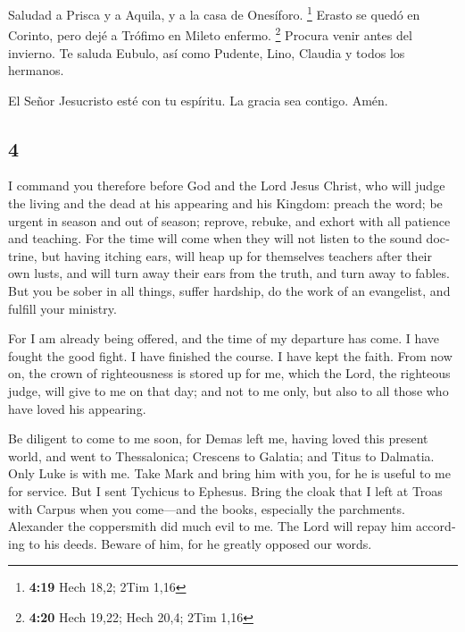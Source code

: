 \begin{paracol}{2}
 Saludad a Prisca y a Aquila, y a la casa de Onesíforo.
\footnote{\textbf{4:19} Hech 18,2; 2Tim 1,16}  Erasto se
quedó en Corinto, pero dejé a Trófimo en Mileto enfermo. \footnote{\textbf{4:20}
  Hech 19,22; Hech 20,4; 2Tim 1,16}  Procura venir antes
del invierno. Te saluda Eubulo, así como Pudente, Lino, Claudia y todos
los hermanos.

 El Señor Jesucristo esté con tu espíritu. La gracia sea
contigo. Amén. \switchcolumn \begin{otherlanguage}{english}

\hypertarget{section-7}{%
\section{4}\label{section-7}}

 I command you therefore before God and the Lord Jesus
Christ, who will judge the living and the dead at his appearing and his
Kingdom:  preach the word; be urgent in season and out of
season; reprove, rebuke, and exhort with all patience and teaching.
 For the time will come when they will not listen to the
sound doctrine, but having itching ears, will heap up for themselves
teachers after their own lusts,  and will turn away their
ears from the truth, and turn away to fables.  But you be
sober in all things, suffer hardship, do the work of an evangelist, and
fulfill your ministry.

 For I am already being offered, and the time of my
departure has come.  I have fought the good fight. I have
finished the course. I have kept the faith.  From now on,
the crown of righteousness is stored up for me, which the Lord, the
righteous judge, will give to me on that day; and not to me only, but
also to all those who have loved his appearing.

 Be diligent to come to me soon,  for Demas
left me, having loved this present world, and went to Thessalonica;
Crescens to Galatia; and Titus to Dalmatia.  Only Luke is
with me. Take Mark and bring him with you, for he is useful to me for
service.  But I sent Tychicus to Ephesus. 
Bring the cloak that I left at Troas with Carpus when you come---and the
books, especially the parchments.  Alexander the
coppersmith did much evil to me. The Lord will repay him according to
his deeds.  Beware of him, for he greatly opposed our
words.


\end{otherlanguage}
\end{paracol}
